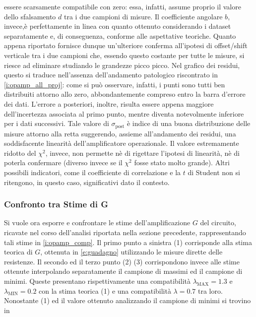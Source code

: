 \documentclass[a4paper,11pt]{article} %
\begin{document}
essere scarsamente compatibile con zero: essa, infatti, assume proprio il valore dello sfalsamento $d$ tra i due
campioni di misure. Il coefficiente angolare $b$, invece,è perfettamente in linea con quanto ottenuto considerando i
dataset separatamente e, di conseguenza, conforme alle aspettative teoriche. Quanto appena riportato fornisce dunque
un'ulteriore conferma all'ipotesi di offset/shift verticale tra i due campioni che, essendo questo costante per tutte le
misure, si riesce ad eliminare studiando le grandezze picco picco. Nel grafico dei residui, questo si traduce
nell'assenza dell'andamento patologico riscontrato in \autoref{i:opamp_all_proj}: come si può osservare, infatti, i punti
sono tutti ben distribuiti attorno allo zero, abbondantemente compreso entro la barra d'errore dei dati. L'errore a
posteriori, inoltre, risulta essere appena maggiore dell'incertezza associata al primo punto, mentre diventa
notevolmente inferiore per i dati successivi. Tale valore di $\sigma_{\text{post}}$ è indice di una buona distribuzione
delle misure attorno alla retta suggerendo, assieme all'andamento dei residui, una soddisfacente linearità
dell'amplificatore operazionale. Il valore estremamente ridotto del $\chi^2$, invece, non permette nè di rigettare
l'ipotesi di linearità, nè di poterla confermare (diverso invece se il $\chi^2$ fosse stato molto grande). Altri
possibili indicatori, come il coefficiente di correlazione e la $t$ di Student non si ritengono, in questo caso,
significativi dato il contesto.



\subsubsection{Confronto tra Stime di G}

Si vuole ora esporre e confrontare le stime dell'amplificazione $G$ del circuito, ricavate nel corso dell'analisi
riportata nella sezione precedente, rappresentando tali stime in \autoref{i:opamp_comp}. Il primo punto a sinistra (1)
corrisponde alla stima teorica di $G$, ottenuta in \autoref{e:guadagno} utilizzando le misure dirette delle resistenze.
Il secondo ed il terzo punto (2) (3) corrispondono invece alle stime ottenute interpolando separatamente il campione di
massimi ed il campione di minimi. Queste presentano rispettivamente una compatibilità $\lambda_{\text{MAX}}=1.3$ e
$\lambda_{\text{MIN}}=0.2$ con la stima teorica (1) e una compatibilità $\lambda=0.7$ tra loro. Nonostante (1) ed il
valore ottenuto analizzando il campione di minimi si trovino in
\end{document}
